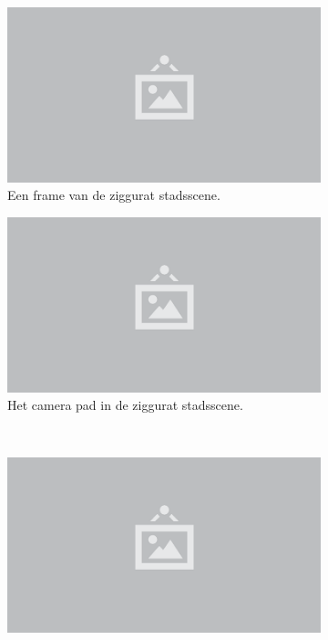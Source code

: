 \begin{figure}[p]
  \begin{subfigure}[b]{.49\linewidth}
    \centering\includegraphics{./img/raw/placeholder.png}
    \caption{Een frame van de ziggurat stadsscene.}\label{fig:test-suite-ziggurat:frame}
  \end{subfigure}%
  \begin{subfigure}[b]{.49\linewidth}
    \centering\includegraphics{./img/raw/placeholder.png}
    \caption{Het camera pad in de ziggurat stadsscene.}\label{fig:test-suite-ziggurat:camera}
  \end{subfigure}
  \\
  \begin{subfigure}[b]{.49\linewidth}
    \centering\includegraphics{./img/raw/placeholder.png}

\end{subfigure}
\end{figure}
